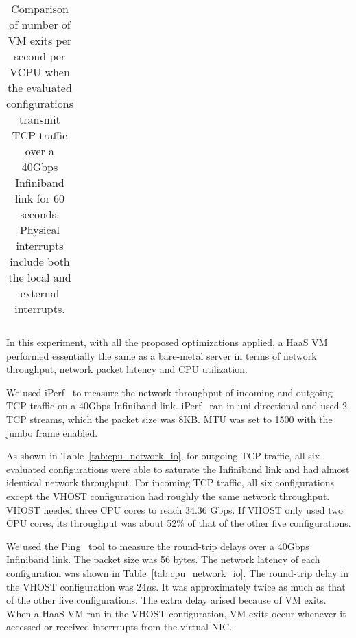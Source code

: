 \begin{table*}[t]
{\begin{tabular}{|l|c|c|c|c|c|c|c|}
\end{tabular}%
}
\caption{Comparison of number of VM exits per second per VCPU
when the evaluated configurations transmit TCP traffic over a
40Gbps Infiniband link for 60 seconds. Physical interrupts
include both the local and external interrupts.}
\label{tab:vm_exit}
\end{table*}

In this experiment, with all the proposed optimizations
applied, a HaaS VM performed essentially the same as a
bare-metal server in terms of network throughput, network
packet latency and CPU utilization.

We used iPerf~\cite{iperf} to measure the network throughput
of incoming and outgoing TCP traffic on a 40Gbps Infiniband
link. iPerf~\cite{iperf} ran in uni-directional and used 2 TCP
streams, which the packet size was 8KB. MTU was set to 1500
with the jumbo frame enabled.

As shown in Table~\ref{tab:cpu_network_io}, for outgoing TCP
traffic, all six evaluated configurations were able to
saturate the Infiniband link and had almost identical network
throughput. For incoming TCP traffic, all six configurations
except the VHOST configuration had roughly the same network
throughput. VHOST needed three CPU cores to reach 34.36 Gbps.
If VHOST only used two CPU cores, its throughput was about
52\% of that of the other five configurations.

We used the Ping~\cite{ping} tool to measure the round-trip
delays over a 40Gbps Infiniband link. The packet size was 56
bytes. The network latency of each configuration was shown in
Table~\ref{tab:cpu_network_io}. The round-trip delay in the
VHOST configuration was 24$\mu$s. It was approximately twice
as much as that of the other five configurations. The extra
delay arised because of VM exits. When a HaaS VM ran in the
VHOST configuration, VM exits occur whenever it accessed or
received interrrupts from the virtual NIC.


